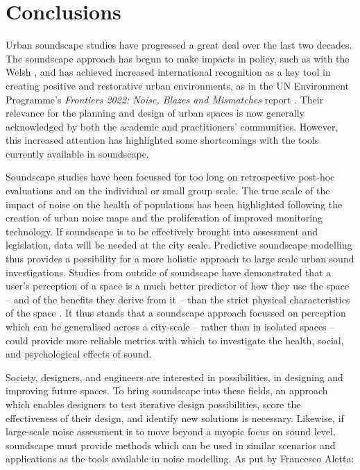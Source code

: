 \chapter{Conclusions}
\label{ch:conc}

Urban soundscape studies have progressed a great deal over the last two decades. The soundscape approach has begun to make impacts in policy, such as with the Welsh \citet{Welsh2018Noise}, and has achieved increased international recognition as a key tool in creating positive and restorative urban environments, as in the UN Environment Programme's \emph{Frontiers 2022: Noise, Blazes and Mismatches} report \citep{Aletta2022Frontiers}. Their relevance for the planning and design of urban spaces is now generally acknowledged by both the academic and practitioners' communities. However, this increased attention has highlighted some shortcomings with the tools currently available in soundscape. 

Soundscape studies have been focussed for too long on retrospective post-hoc evaluations and on the individual or small group scale. The true scale of the impact of noise on the health of populations has been highlighted following the creation of urban noise maps and the proliferation of improved monitoring technology. If soundscape is to be effectively brought into assessment and legislation, data will be needed at the city scale.  Predictive soundscape modelling thus provides a possibility for a more holistic approach to large scale urban sound investigations. Studies from outside of soundscape have demonstrated that a user's perception of a space is a much better predictor of how they use the space -- and of the benefits they derive from it -- than the strict physical characteristics of the space \citep{Kruize2019Exploring}. It thus stands that a soundscape approach focussed on perception which can be generalised across a city-scale -- rather than in isolated spaces -- could provide more reliable metrics with which to investigate the health, social, and psychological effects of sound.

Society, designers, and engineers are interested in possibilities, in designing and improving future spaces. To bring soundscape into these fields, an approach which enables designers to test iterative design possibilities, score the effectiveness of their design, and identify new solutions is necessary. Likewise, if large-scale noise assessment is to move beyond a myopic focus on sound level, soundscape must provide methods which can be used in similar scenarios and applications as the tools available in noise modelling. As put by Francesco Aletta:

